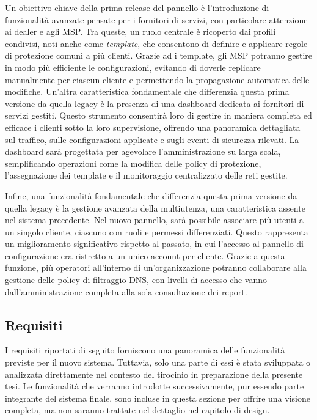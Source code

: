 Un obiettivo chiave della prima release del pannello è l'introduzione di funzionalità avanzate pensate per i fornitori di servizi, con particolare attenzione ai dealer e agli MSP. Tra queste, un ruolo centrale è ricoperto dai profili condivisi, noti anche come \textit{template}, che consentono di definire e applicare regole di protezione comuni a più clienti. Grazie ad i template, gli MSP potranno gestire in modo più efficiente le configurazioni, evitando di doverle replicare manualmente per ciascun cliente e permettendo la propagazione automatica delle modifiche.
%
Un'altra caratteristica fondamentale che differenzia questa prima versione da quella legacy è la presenza di una dashboard dedicata ai fornitori di servizi gestiti. Questo strumento consentirà loro di gestire in maniera completa ed efficace i clienti sotto la loro supervisione, offrendo una panoramica dettagliata sul traffico, sulle configurazioni applicate e sugli eventi di sicurezza rilevati. La dashboard sarà progettata per agevolare l’amministrazione su larga scala, semplificando operazioni come la modifica delle policy di protezione, l'assegnazione dei template e il monitoraggio centralizzato delle reti gestite.

Infine, una funzionalità fondamentale che differenzia questa prima versione da quella legacy è la gestione avanzata della multiutenza, una caratteristica assente nel sistema precedente. Nel nuovo pannello, sarà possibile associare più utenti a un singolo cliente, ciascuno con ruoli e permessi differenziati. Questo rappresenta un miglioramento significativo rispetto al passato, in cui l’accesso al pannello di configurazione era ristretto a un unico account per cliente. Grazie a questa funzione, più operatori all'interno di un'organizzazione potranno collaborare alla gestione delle policy di filtraggio DNS, con livelli di accesso che vanno dall'amministrazione completa alla sola consultazione dei report.

\subsection{Requisiti}
I requisiti riportati di seguito forniscono una panoramica delle funzionalità previste per il nuovo sistema. Tuttavia, solo una parte di essi è stata sviluppata o analizzata direttamente nel contesto del tirocinio in preparazione della presente tesi. Le funzionalità che verranno introdotte successivamente, pur essendo parte integrante del sistema finale, sono incluse in questa sezione per offrire una visione completa, ma non saranno trattate nel dettaglio nel capitolo di design.

